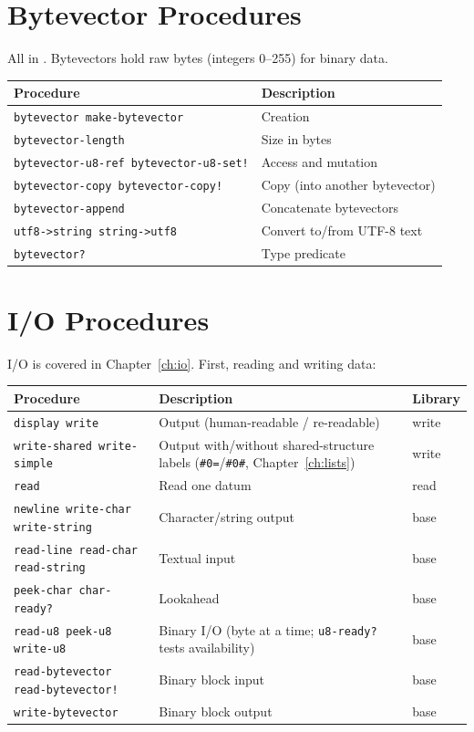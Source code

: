 \section{Bytevector Procedures}

All in . Bytevectors hold raw bytes (integers 0--255) for binary data.

\begin{center}
\small
\begin{tabularx}{\textwidth}{@{}lY@{}}
\textbf{Procedure} & \textbf{Description} \\
\hline
\texttt{bytevector make-bytevector} & Creation \\
\texttt{bytevector-length} & Size in bytes \\
\texttt{bytevector-u8-ref bytevector-u8-set!} & Access and mutation \\
\texttt{bytevector-copy bytevector-copy!} & Copy (into another bytevector) \\
\texttt{bytevector-append} & Concatenate bytevectors \\
\texttt{utf8->string string->utf8} & Convert to/from UTF-8 text \\
\texttt{bytevector?} & Type predicate \\
\end{tabularx}
\end{center}

\section{I/O Procedures}

I/O is covered in Chapter~\ref{ch:io}. First, reading and writing data:

\begin{center}
\small
\begin{tabularx}{\textwidth}{@{}lYl@{}}
\textbf{Procedure} & \textbf{Description} & \textbf{Library} \\
\hline
\texttt{display write} & Output (human-readable / re-readable) & write \\
\texttt{write-shared write-simple} & Output with/without shared-structure labels (\texttt{\#0=}/\texttt{\#0\#}, Chapter~\ref{ch:lists}) & write \\
\texttt{read} & Read one datum & read \\
\texttt{newline write-char write-string} & Character/string output & base \\
\texttt{read-line read-char read-string} & Textual input & base \\
\texttt{peek-char char-ready?} & Lookahead & base \\
\texttt{read-u8 peek-u8 write-u8} & Binary I/O (byte at a time; \texttt{u8-ready?} tests availability) & base \\
\texttt{read-bytevector read-bytevector!} & Binary block input & base \\
\texttt{write-bytevector} & Binary block output & base \\
\end{tabularx}
\end{center}

